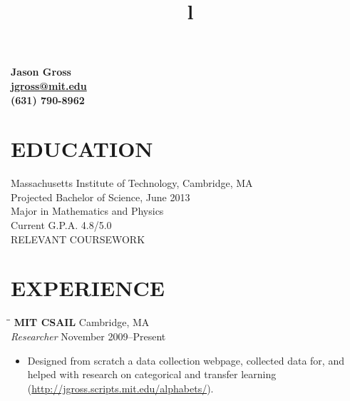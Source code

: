 \documentclass[11pt]{res}
\title{l}\location{r} \\
\begin{document}
\begin{center}
  \LARGE \bf Jason Gross \\
  \large \href{mailto:jgross@mit.edu}{jgross@mit.edu} \\
  \large (631) 790-8962
\end{center}

\address{\bf  PRESENT ADDRESS\\3 Ames Street, Box \# 99\\Cambridge, MA 02142}
\address{\bf PERMANENT ADDRESS \\ 126 Hayrick Lane \\  Commack, NY 11725}
                                  
\begin{resume}

 
\section{EDUCATION}          
    Massachusetts Institute of Technology, Cambridge, MA  \\        
    Projected Bachelor of Science, June 2013   \\       
    Major in Mathematics and Physics       \\   
    Current G.P.A. 4.8/5.0  \\
    RELEVANT COURSEWORK

 
\section{EXPERIENCE}
   \vspace{-0.1in}	
   \begin{tabbing}
   \hspace{2.3in}\= \hspace{2.6in}\= \kill %
    {\bf MIT CSAIL}  \>     \> Cambridge, MA\\
    \emph{Researcher} \>                         \>November 2009--Present
   \end{tabbing}%
   \begin{itemize}
     \item Designed from scratch a data collection webpage, collected data for, and helped with research on categorical and transfer learning (\url{http://jgross.scripts.mit.edu/alphabets/}).
   \end{itemize}


\end{resume}
\end{document}
